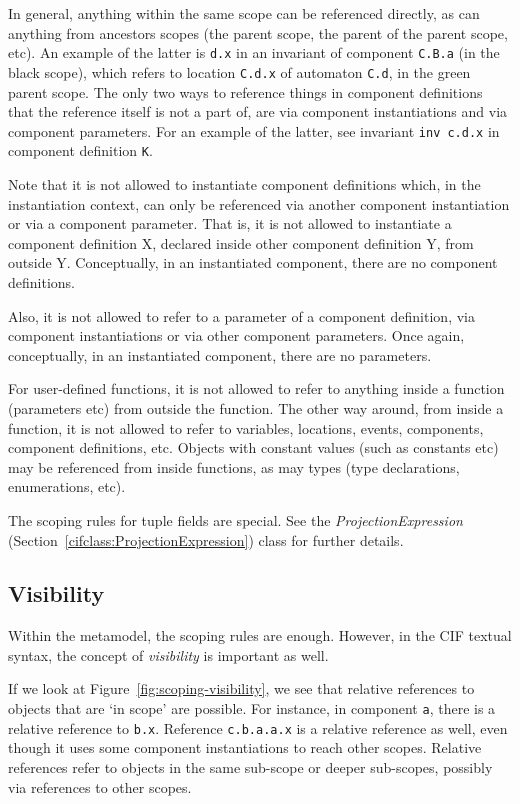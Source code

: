 \documentclass{report}
\newcommand{\cifclass}[1]{\textit{#1} (Section~\ref{cifclass:#1})}
\begin{document}
In general, anything within the same scope can be referenced directly, as can
anything from ancestors scopes (the parent scope, the parent of the parent
scope, etc). An example of the latter is \texttt{d.x}
in an invariant of component \texttt{C.B.a} (in the black scope), which refers
to location \texttt{C.d.x} of automaton \texttt{C.d}, in the green parent
scope. The only two ways to reference things in component definitions
that the reference itself is not a part of, are via component
instantiations and via component parameters. For an example of the latter,
see invariant \texttt{inv c.d.x} in component definition \texttt{K}.

Note that it is not allowed to instantiate component definitions which, in the
instantiation context, can only be referenced via another component
instantiation or via a component parameter. That is, it is not allowed to
instantiate a component definition X, declared inside other component
definition Y, from outside Y. Conceptually, in an instantiated component,
there are no component definitions.

Also, it is not allowed to refer to a parameter of a component definition,
via component instantiations or via other component parameters. Once again,
conceptually, in an instantiated component, there are no parameters.

For user-defined functions, it is not allowed to refer to anything inside a
function (parameters etc) from outside the function. The other way around, from
inside a function, it is not allowed to refer to variables, locations, events,
components, component definitions, etc. Objects with constant values (such as
constants etc) may be referenced from inside functions, as may types (type
declarations, enumerations, etc).

The scoping rules for tuple fields are special. See the
\cifclass{ProjectionExpression} class for further details.


\subsection{Visibility}

Within the metamodel, the scoping rules are enough. However, in the CIF
textual syntax, the concept of \emph{visibility} is important as well.

If we look at Figure~\ref{fig:scoping-visibility}, we see that relative
references to objects that are `in scope' are possible. For instance, in
component \texttt{a}, there is a relative reference to \texttt{b.x}.
Reference \texttt{c.b.a.a.x} is a relative reference as well, even though it
uses some component instantiations to reach other scopes. Relative references
refer to objects in the same sub-scope or deeper sub-scopes, possibly via
references to other scopes.
\end{document}
